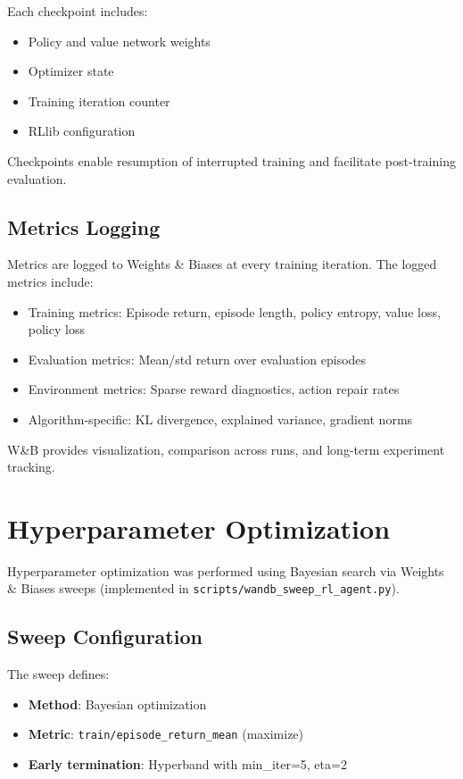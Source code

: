 \documentclass[english,bachelor]{hsluthesis}
\begin{document}
Each checkpoint includes:

\begin{itemize}
    \item Policy and value network weights
    \item Optimizer state
    \item Training iteration counter
    \item RLlib configuration
\end{itemize}

Checkpoints enable resumption of interrupted training and facilitate post-training evaluation.

\subsection{Metrics Logging}

Metrics are logged to Weights \& Biases at every training iteration. The logged metrics include:

\begin{itemize}
    \item Training metrics: Episode return, episode length, policy entropy, value loss, policy loss
    \item Evaluation metrics: Mean/std return over evaluation episodes
    \item Environment metrics: Sparse reward diagnostics, action repair rates
    \item Algorithm-specific: KL divergence, explained variance, gradient norms
\end{itemize}

W\&B provides visualization, comparison across runs, and long-term experiment tracking.

\section{Hyperparameter Optimization}

Hyperparameter optimization was performed using Bayesian search via Weights \& Biases sweeps (implemented in \texttt{scripts/wandb\_sweep\_rl\_agent.py}).

\subsection{Sweep Configuration}

The sweep defines:

\begin{itemize}
    \item \textbf{Method}: Bayesian optimization
    \item \textbf{Metric}: \texttt{train/episode\_return\_mean} (maximize)
    \item \textbf{Early termination}: Hyperband with min\_iter=5, eta=2
\end{itemize}
\end{document}
